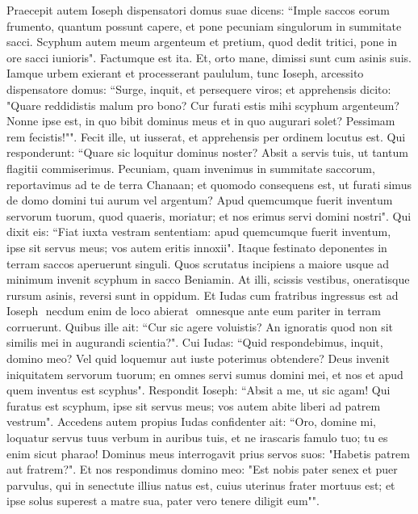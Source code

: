 \begin{biblechapter}  
\verse Praecepit autem Ioseph dispensatori domus suae dicens: “Imple saccos eorum frumento, quantum possunt capere, et pone pecuniam singulorum in summitate sacci. 
\verse Scyphum autem meum argenteum et pretium, quod dedit tritici, pone in ore sacci iunioris". Factumque est ita. 
\verse Et, orto mane, dimissi sunt cum asinis suis. 
\verse Iamque urbem exierant et processerant paululum, tunc Ioseph, arcessito dispensatore domus: “Surge, inquit, et persequere viros; et apprehensis dicito: "Quare reddidistis malum pro bono? Cur furati estis mihi scyphum argenteum? 
\verse Nonne ipse est, in quo bibit dominus meus et in quo augurari solet? Pessimam rem fecistis!"". 
\verse Fecit ille, ut iusserat, et apprehensis per ordinem locutus est. 
\verse Qui responderunt: “Quare sic loquitur dominus noster? Absit a servis tuis, ut tantum flagitii commiserimus. 
\verse Pecuniam, quam invenimus in summitate saccorum, reportavimus ad te de terra Chanaan; et quomodo consequens est, ut furati simus de domo domini tui aurum vel argentum? 
\verse Apud quemcumque fuerit inventum servorum tuorum, quod quaeris, moriatur; et nos erimus servi domini nostri". 
\verse Qui dixit eis: “Fiat iuxta vestram sententiam: apud quemcumque fuerit inventum, ipse sit servus meus; vos autem eritis innoxii". 
\verse Itaque festinato deponentes in terram saccos aperuerunt singuli. 
\verse Quos scrutatus incipiens a maiore usque ad minimum invenit scyphum in sacco Beniamin. 
\verse At illi, scissis vestibus, oneratisque rursum asinis, reversi sunt in oppidum. 
\verse Et Iudas cum fratribus ingressus est ad Ioseph ­ necdum enim de loco abierat ­ omnesque ante eum pariter in terram corruerunt. 
\verse Quibus ille ait: “Cur sic agere voluistis? An ignoratis quod non sit similis mei in augurandi scientia?". 
\verse Cui Iudas: “Quid respondebimus, inquit, domino meo? Vel quid loquemur aut iuste poterimus obtendere? Deus invenit iniquitatem servorum tuorum; en omnes servi sumus domini mei, et nos et apud quem inventus est scyphus". 
\verse Respondit Ioseph: “Absit a me, ut sic agam! Qui furatus est scyphum, ipse sit servus meus; vos autem abite liberi ad patrem vestrum". 
\verse Accedens autem propius Iudas confidenter ait: “Oro, domine mi, loquatur servus tuus verbum in auribus tuis, et ne irascaris famulo tuo; tu es enim sicut pharao! 
\verse Dominus meus interrogavit prius servos suos: "Habetis patrem aut fratrem?". 
\verse Et nos respondimus domino meo: "Est nobis pater senex et puer parvulus, qui in senectute illius natus est, cuius uterinus frater mortuus est; et ipse solus superest a matre sua, pater vero tenere diligit eum"". 

\end{biblechapter}
